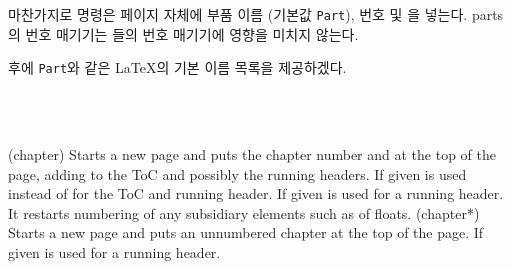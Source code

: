 마찬가지로 \cmd{\part} 명령은 페이지 자체에 부품 이름 (기본값 \texttt{Part}), 번호 및 을 넣는다.
parts의 번호 매기기는 \cmd{\chapter}들의 번호 매기기에 영향을 미치지 않는다.



    후에 \texttt{Part}와 같은 LaTeX의 기본 이름 목록을 제공하겠다.

\begin{syntax}
\cmd{\chapter} \\
\cmd{\chapter*} \\
\end{syntax}
\glossary(chapter)%
  {}
  {Starts a new page and puts the chapter number and 
   at the top of the page, adding  to the ToC and possibly
   the running headers. If given 
   is used instead of  for the ToC and running header. If given
    is used for a running header.
   It restarts numbering of any subsidiary elements
   such as  of floats.}
\glossary(chapter*)%
  {}
  {Starts a new page and puts an unnumbered chapter 
   at the top of the page. If given  is used for a
   running header.}

